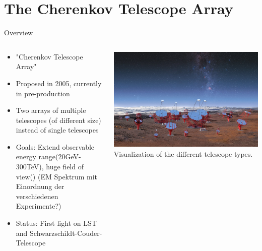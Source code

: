 \section{The Cherenkov Telescope Array}


\begin{frame}{Overview}
    \begin{columns}[T] %
        \begin{column}{.45\textwidth}
            \vspace{10pt}
            \begin{itemize}
                \item "Cherenkov Telescope Array"
                \item Proposed in 2005, currently in pre-production
                \item Two arrays of multiple telescopes (of different size) instead of single telescopes
                \item Goals: Extend observable energy range(20GeV-300TeV), huge field of view() (EM Spektrum mit Einordnung der verschiedenen Experimente?)
                \item Status: First light on LST and Schwarzschildt-Couder-Telescope
            \end{itemize}
        \end{column}%
        \hfill%
        \begin{column}{.53\textwidth}
            \includegraphics[width=\linewidth]{images/cta_telescopes.jpg}
            Visualization of the different telescope types.
            \cite{cta_telescopes}
        \end{column}%
    \end{columns}
    
\end{frame}



